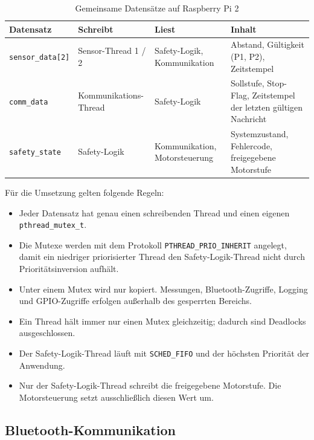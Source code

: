 \begin{table}[H]
    \centering
    \small
    \begin{tabularx}{\textwidth}{@{}p{3.2cm}p{3.0cm}p{3.0cm}Y@{}}
        \toprule
        \textbf{Datensatz} & \textbf{Schreibt} & \textbf{Liest} & \textbf{Inhalt} \\
        \midrule
        \texttt{sensor\_data[2]} & Sensor-Thread 1 / 2 & Safety-Logik, Kommunikation & Abstand, Gültigkeit (P1, P2), Zeitstempel \\
        \texttt{comm\_data} & Kommunikations-Thread & Safety-Logik & Sollstufe, Stop-Flag, Zeitstempel der letzten gültigen Nachricht \\
        \texttt{safety\_state} & Safety-Logik & Kommunikation, Motorsteuerung & Systemzustand, Fehlercode, freigegebene Motorstufe \\
        \bottomrule
    \end{tabularx}
    \caption{Gemeinsame Datensätze auf Raspberry Pi 2}
\end{table}

Für die Umsetzung gelten folgende Regeln:

\begin{itemize}
    \item Jeder Datensatz hat genau einen schreibenden Thread und einen eigenen \texttt{pthread\_mutex\_t}.
    \item Die Mutexe werden mit dem Protokoll \texttt{PTHREAD\_PRIO\_INHERIT} angelegt, damit ein niedriger priorisierter Thread den Safety-Logik-Thread nicht durch Prioritätsinversion aufhält.
    \item Unter einem Mutex wird nur kopiert. Messungen, Bluetooth-Zugriffe, Logging und GPIO-Zugriffe erfolgen außerhalb des gesperrten Bereichs.
    \item Ein Thread hält immer nur einen Mutex gleichzeitig; dadurch sind Deadlocks ausgeschlossen.
    \item Der Safety-Logik-Thread läuft mit \texttt{SCHED\_FIFO} und der höchsten Priorität der Anwendung.
    \item Nur der Safety-Logik-Thread schreibt die freigegebene Motorstufe. Die Motorsteuerung setzt ausschließlich diesen Wert um.
\end{itemize}

\subsection{Bluetooth-Kommunikation}
\label{sec:bt}

